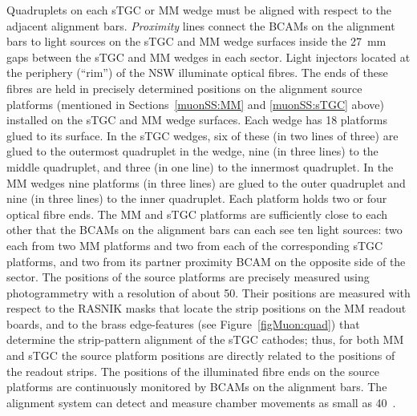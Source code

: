 \documentclass[cernpreprint, atlasdraft=false, UKenglish,british,orcidlogo, texmf, orcidlogo]{atlasdoc}
\begin{document}
Quadruplets on each \gls{sTGC} or \gls{MM} wedge must be aligned with respect to the adjacent alignment bars.
{\em Proximity} lines connect the \glspl{BCAM} on the alignment bars to light sources on the \gls{sTGC} and \gls{MM} wedge surfaces inside the \SI{27}{\mm} gaps between the \gls{sTGC} and \gls{MM} wedges in each sector.
Light injectors located at the periphery (``rim'') of the \gls{NSW} illuminate optical fibres.
The ends of these fibres are held in precisely determined positions on the alignment source platforms (mentioned in Sections~\ref{muonSS:MM} and \ref{muonSS:sTGC} above) installed on the \gls{sTGC} and \gls{MM} wedge surfaces.
Each wedge has \num{18} platforms glued to its surface. In the \gls{sTGC} wedges, six of these (in two lines of three) are glued to the outermost quadruplet in the wedge, nine (in three lines) to the middle quadruplet, and three (in one line) to the innermost quadruplet. In the \gls{MM} wedges nine platforms (in three lines) are glued to the outer quadruplet and nine (in three lines) to the inner quadruplet. Each platform holds two or four optical fibre ends. The \gls{MM} and \gls{sTGC} platforms are sufficiently close to each other that the \glspl{BCAM} on the alignment bars can each see ten light sources: two each from two \gls{MM} platforms and two from each of the corresponding \gls{sTGC} platforms, and two from its partner proximity \gls{BCAM} on the opposite side of the sector.
The positions of the source platforms are precisely measured using photogrammetry with a resolution of about \SI{50}{\micron}.
Their positions are measured with respect to the \gls{RASNIK} masks that locate the strip positions on the \gls{MM} readout boards, and to the brass edge-features (see Figure~\ref{figMuon:quad}) that determine the strip-pattern alignment of the \gls{sTGC} cathodes; thus, for both \gls{MM} and \gls{sTGC} the source platform positions are directly related to the positions of the readout strips.
The positions of the illuminated fibre ends on the source platforms are continuously monitored by \glspl{BCAM} on the alignment bars.
The alignment system can detect and measure chamber movements as small as \SI{40}{\micron}~\cite{Aefsky_2008}.
 
\end{document}
